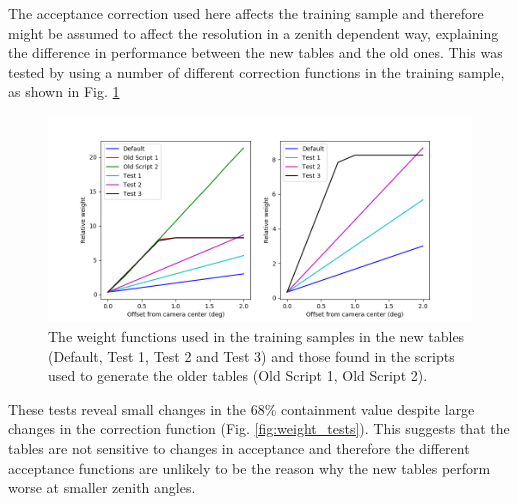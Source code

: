 \documentclass[main.tex]{subfiles}
\begin{document}
The acceptance correction used here affects the training sample and therefore might be assumed to affect the resolution in a zenith dependent way, explaining the difference in performance between the new \disp tables and the old ones. This was tested by using a number of different correction functions in the training sample, as shown in Fig. \ref{fig:weights}

\begin{figure}[htbp]
  \centering
  \includegraphics[width=.78\linewidth]{images/weights}
  \caption[Weight functions for offset from camera center.]{The weight functions used in the training samples in the new tables (Default, Test 1, Test 2 and Test 3) and those found in the scripts used to generate the older tables (Old Script 1, Old Script 2).}
  \label{fig:weights}
\end{figure}

These tests reveal small changes in the 68\% containment value despite large changes in the correction function (Fig. \ref{fig:weight_tests}). This suggests that the \disp tables are not sensitive to changes in acceptance and therefore the different acceptance functions are unlikely to be the reason why the new \disp tables perform worse at smaller zenith angles.
\end{document}
